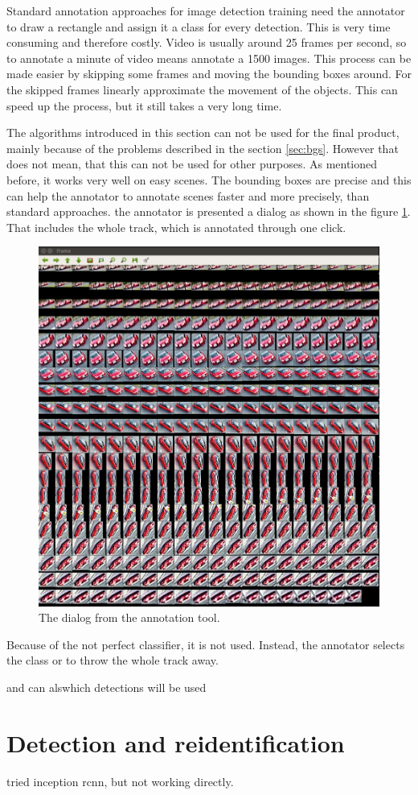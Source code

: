 \documentclass[a4paper,12pt,titlepage]{article}
\numberwithin{figure}{section}
\begin{document}
Standard annotation approaches for image detection training need the annotator to draw a rectangle and assign it a class for every detection. This is very time consuming and therefore costly. Video is usually around 25 frames per second, so to annotate a minute of video means annotate a 1500 images. This process can be made easier by skipping some frames and moving the bounding boxes around. For the skipped frames linearly approximate the movement of the objects. This can speed up the process, but it still takes a very long time. 


The algorithms introduced in this section can not be used for the final product, mainly because of the problems described in the section \ref{sec:bgs}. However that does not mean, that this can not be used for other purposes. As mentioned before, it works very well on easy scenes. The bounding boxes are precise and this can help the annotator to annotate scenes faster and more precisely, than standard approaches. the annotator is presented a dialog as shown in the figure \ref{fig:labeling}. That includes the whole track, which is annotated through one click. 


\begin{figure}[h!]
\centering
\includegraphics[width=0.5\linewidth]{fig/omni_labeling.png}
\caption{The dialog from the annotation tool.}
\label{fig:labeling}
\end{figure}


Because of the not perfect classifier, it is not used. Instead, the annotator selects the class or to throw the whole track away.


and can alswhich detections will be used



\section{Detection and reidentification}
tried inception rcnn, but not working directly.
\end{document}
